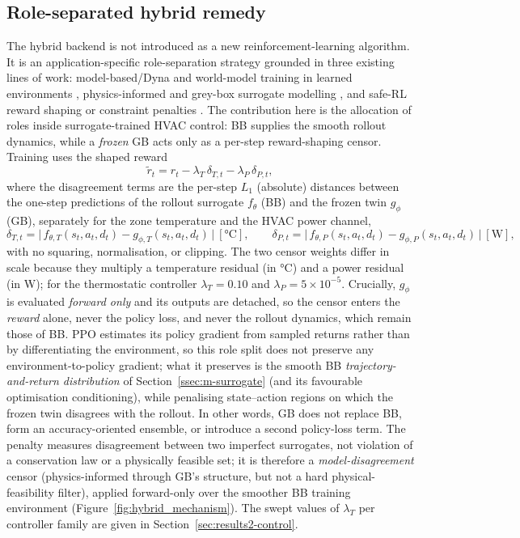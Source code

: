 \subsection{Role-separated hybrid remedy}\label{ssec:m-hybrid}
The hybrid backend is not introduced as a new reinforcement-learning algorithm.
It is an application-specific role-separation strategy grounded in three existing
lines of work: model-based/Dyna and world-model training in learned environments
\citep{Sutton1991Dyna,Hafner2025Dreamer}, physics-informed and grey-box surrogate
modelling \citep{Bacher2011RCIdentification,Raissi2019PINN,Karpatne2017TheoryGuided,Willard2022PIML},
and safe-RL reward shaping or constraint penalties \citep{Garcia2015SafeRL,Wang2025SafeDRL}.
The contribution here is the allocation of roles inside surrogate-trained HVAC
control: BB supplies the smooth rollout dynamics, while a \emph{frozen} GB acts
only as a per-step reward-shaping censor. Training uses the shaped reward
\begin{equation}
\tilde{r}_t = r_t - \lambda_T\,\delta_{T,t} - \lambda_P\,\delta_{P,t},
\label{eq:m-hybrid}
\end{equation}
where the disagreement terms are the per-step $L_1$ (absolute) distances between the
one-step predictions of the rollout surrogate $f_\theta$ (BB) and the frozen twin
$g_\phi$ (GB), separately for the zone temperature and the HVAC power channel,
\begin{equation*}
\delta_{T,t} = \big|\, f_{\theta,T}(s_t,a_t,d_t) - g_{\phi,T}(s_t,a_t,d_t)\,\big|\ [\si{\celsius}],
\qquad
\delta_{P,t} = \big|\, f_{\theta,P}(s_t,a_t,d_t) - g_{\phi,P}(s_t,a_t,d_t)\,\big|\ [\si{\watt}],
\end{equation*}
with no squaring, normalisation, or clipping. The two censor weights differ in scale
because they multiply a temperature residual (in \si{\celsius}) and a power residual
(in \si{\watt}); for the thermostatic controller $\lambda_T = 0.10$ and
$\lambda_P = 5\times10^{-5}$. Crucially, $g_\phi$ is evaluated \emph{forward only}
and its outputs are detached, so the censor enters the \emph{reward} alone, never
the policy loss, and never the rollout dynamics, which remain those of BB. PPO
estimates its policy gradient from sampled returns rather than by differentiating
the environment, so this role split does not preserve any environment-to-policy
gradient; what it preserves is the smooth BB \emph{trajectory-and-return
distribution} of Section~\ref{ssec:m-surrogate} (and its favourable optimisation
conditioning), while penalising state--action regions on which the frozen twin
disagrees with the rollout. In other words, GB does not replace BB, form an
accuracy-oriented ensemble, or introduce a second policy-loss term. The penalty
measures disagreement between two imperfect surrogates, not violation of a
conservation law or a physically feasible set; it is therefore a
\emph{model-disagreement} censor (physics-informed through GB's structure, but not
a hard physical-feasibility filter), applied forward-only over the smoother BB
training environment (Figure~\ref{fig:hybrid_mechanism}). The swept values of $\lambda_T$ per controller family are given in
Section~\ref{sec:results2-control}.

